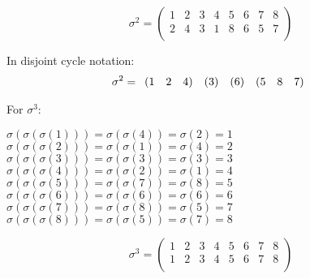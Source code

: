 \documentclass[a4paper]{article}
\begin{document}
\begin{myparindent}{0pt}
\[
  \sigma^2 =
  \begin{pmatrix}
    1 & 2 & 3 & 4 & 5 & 6 & 7 & 8 \\
    2 & 4 & 3 & 1 & 8 & 6 & 5 & 7 \\
  \end{pmatrix}
\]

In disjoint cycle notation:
\[
    \noindent \sigma^2 = \begin{array}{rrr} (1 & 2 & 4) \end{array}
    \noindent \begin{array}{r} (3) \end{array}
    \noindent \begin{array}{r} (6) \end{array}
    \noindent \begin{array}{rrr} (5 & 8 & 7) \end{array}
\]

For $\sigma^3$:

$\sigma(\sigma(\sigma(1))) = \sigma(\sigma(4)) = \sigma(2) = 1$ \newline
$\sigma(\sigma(\sigma(2))) = \sigma(\sigma(1)) = \sigma(4) = 2$ \newline
$\sigma(\sigma(\sigma(3))) = \sigma(\sigma(3)) = \sigma(3) = 3$ \newline
$\sigma(\sigma(\sigma(4))) = \sigma(\sigma(2)) = \sigma(1) = 4$ \newline
$\sigma(\sigma(\sigma(5))) = \sigma(\sigma(7)) = \sigma(8) = 5$ \newline
$\sigma(\sigma(\sigma(6))) = \sigma(\sigma(6)) = \sigma(6) = 6$ \newline
$\sigma(\sigma(\sigma(7))) = \sigma(\sigma(8)) = \sigma(5) = 7$ \newline
$\sigma(\sigma(\sigma(8))) = \sigma(\sigma(5)) = \sigma(7) = 8$ \newline

\[
  \sigma^3 =
  \begin{pmatrix}
      1 & 2 & 3 & 4 & 5 & 6 & 7 & 8 \\
      1 & 2 & 3 & 4 & 5 & 6 & 7 & 8 \\
  \end{pmatrix}
\]


\end{myparindent}
\end{document}
